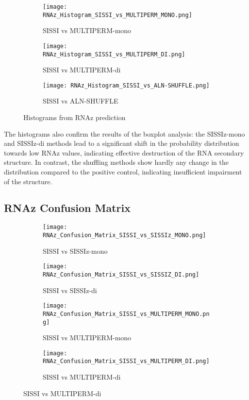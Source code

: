 \documentclass{article}
\begin{document}
\begin{large}
\begin{large}
\begin{large}
\begin{figure}[H]
    \begin{subfigure}[b]{0.48\textwidth}
        \texttt{[image: RNAz\_Histogram\_SISSI\_vs\_MULTIPERM\_MONO.png]}
        \caption{SISSI vs MULTIPERM-mono}
    \end{subfigure}
    \hfill
    \begin{subfigure}[b]{0.48\textwidth}
        \texttt{[image: RNAz\_Histogram\_SISSI\_vs\_MULTIPERM\_DI.png]}
        \caption{SISSI vs MULTIPERM-di}
    \end{subfigure}
    \vspace{1em}
    
    \begin{subfigure}[b]{0.48\textwidth}
        \texttt{[image: RNAz\_Histogram\_SISSI\_vs\_ALN-SHUFFLE.png]}
        \caption{SISSI vs ALN-SHUFFLE}
    \end{subfigure}

    \caption{Histograms from RNAz prediction}
\end{figure}

The histograms also confirm the results of the boxplot analysis: the SISSIz-mono and SISSIz-di methods lead to a significant shift in the probability distribution towards low RNAz values, indicating effective destruction of the RNA secondary structure. In contrast, the shuffling methods show hardly any change in the distribution compared to the positive control, indicating insufficient impairment of the structure.

\subsection{RNAz Confusion Matrix}

\begin{figure}[H]
    \centering
    \begin{subfigure}[b]{0.48\textwidth}
        \texttt{[image: RNAz\_Confusion\_Matrix\_SISSI\_vs\_SISSIz\_MONO.png]}
        \caption{SISSI vs SISSIz-mono}
    \end{subfigure}
    \hfill
    \begin{subfigure}[b]{0.48\textwidth}
        \texttt{[image: RNAz\_Confusion\_Matrix\_SISSI\_vs\_SISSIZ\_DI.png]}
        \caption{SISSI vs SISSIz-di}
    \end{subfigure}
    \vspace{1em}
    
    \begin{subfigure}[b]{0.48\textwidth}
        \texttt{[image: RNAz\_Confusion\_Matrix\_SISSI\_vs\_MULTIPERM\_MONO.png]}
        \caption{SISSI vs MULTIPERM-mono}
    \end{subfigure}
    \hfill
    \begin{subfigure}[b]{0.48\textwidth}
        \texttt{[image: RNAz\_Confusion\_Matrix\_SISSI\_vs\_MULTIPERM\_DI.png]}
        \caption{SISSI vs MULTIPERM-di}
    \end{subfigure}
    \vspace{1em}
    

\end{figure}
\end{large}
\end{large}
\end{large}
\end{document}
